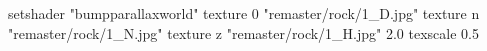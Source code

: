 setshader "bumpparallaxworld"
    texture 0 "remaster/rock/1_D.jpg"
    texture n "remaster/rock/1_N.jpg"
    texture z "remaster/rock/1_H.jpg" 2.0
    texscale 0.5